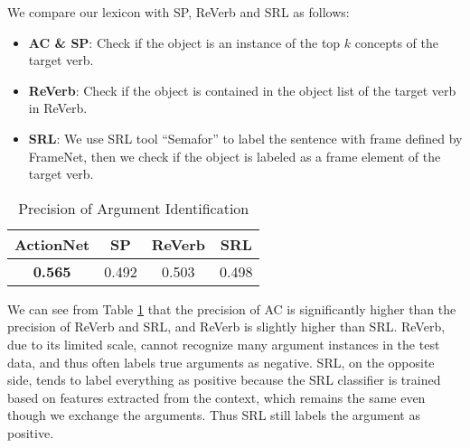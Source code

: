 We compare our lexicon with SP, ReVerb and SRL as follows:
\begin{itemize}
\item {\bf AC \& SP}: Check if the object is an instance of the top $k$ concepts of the target verb.
\item {\bf ReVerb}: Check if the object is contained in the object list of the target verb in ReVerb.
\item {\bf SRL}: We use SRL tool ``Semafor''\cite{chen2010semafor}
to label the sentence with frame defined by FrameNet,
then we check if the object is labeled as a frame element of the target verb.
\end{itemize}

\begin{table}[th]
\centering
\scriptsize
\caption{Precision of Argument Identification}
\begin{tabular}{|c|c|c|c|}
\hline
ActionNet & SP & ReVerb & SRL \\
\hline
\hline
{\bf 0.565} & 0.492 & 0.503 & 0.498 \\
\hline
\end{tabular}
\label{tab:argumentidentify}
\end{table}

We can see from Table \ref{tab:argumentidentify} that
the precision of AC is significantly higher than the precision of ReVerb and SRL,
and ReVerb is slightly higher than SRL.
ReVerb, due to its limited scale,  cannot recognize many argument
instances in the test data, and thus often labels true arguments
as negative. SRL, on the opposite side, tends to label everything
as positive because the SRL classifier is trained based
on features extracted from the context, which remains the same
even though we exchange the arguments. Thus SRL still labels the
argument as positive. 

